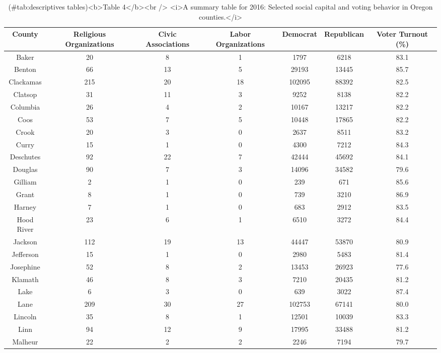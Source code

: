 \documentclass[
  english,
  man]{apa6}
\begin{document}
\begin{table}

\caption{(\#tab:descriptives tables)<b>Table 4</b><br /> <i>A summary table for 2016: Selected social capital and voting behavior in Oregon counties.</i>}
\centering
\begin{tabular}[t]{c|c|c|c|c|c|c}
\hline
County & Religious Organizations & Civic Associations & Labor Organizations & Democrat & Republican & Voter Turnout (\%)\\
\hline
Baker & 20 & 8 & 1 & 1797 & 6218 & 83.1\\
\hline
Benton & 66 & 13 & 5 & 29193 & 13445 & 85.7\\
\hline
Clackamas & 215 & 20 & 18 & 102095 & 88392 & 82.5\\
\hline
Clatsop & 31 & 11 & 3 & 9252 & 8138 & 82.2\\
\hline
Columbia & 26 & 4 & 2 & 10167 & 13217 & 82.2\\
\hline
Coos & 53 & 7 & 5 & 10448 & 17865 & 82.2\\
\hline
Crook & 20 & 3 & 0 & 2637 & 8511 & 83.2\\
\hline
Curry & 15 & 1 & 0 & 4300 & 7212 & 84.3\\
\hline
Deschutes & 92 & 22 & 7 & 42444 & 45692 & 84.1\\
\hline
Douglas & 90 & 7 & 3 & 14096 & 34582 & 79.6\\
\hline
Gilliam & 2 & 1 & 0 & 239 & 671 & 85.6\\
\hline
Grant & 8 & 1 & 0 & 739 & 3210 & 86.9\\
\hline
Harney & 7 & 1 & 0 & 683 & 2912 & 83.5\\
\hline
Hood River & 23 & 6 & 1 & 6510 & 3272 & 84.4\\
\hline
Jackson & 112 & 19 & 13 & 44447 & 53870 & 80.9\\
\hline
Jefferson & 15 & 1 & 0 & 2980 & 5483 & 81.4\\
\hline
Josephine & 52 & 8 & 2 & 13453 & 26923 & 77.6\\
\hline
Klamath & 46 & 8 & 3 & 7210 & 20435 & 81.2\\
\hline
Lake & 6 & 3 & 0 & 639 & 3022 & 87.4\\
\hline
Lane & 209 & 30 & 27 & 102753 & 67141 & 80.0\\
\hline
Lincoln & 35 & 8 & 1 & 12501 & 10039 & 83.3\\
\hline
Linn & 94 & 12 & 9 & 17995 & 33488 & 81.2\\
\hline
Malheur & 22 & 2 & 2 & 2246 & 7194 & 79.7\\

\end{tabular}
\end{table}
\end{document}
